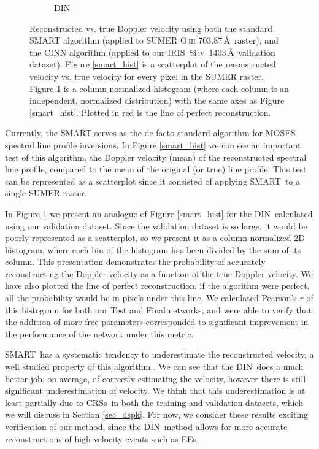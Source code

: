 \documentclass[10pt,letterpaper]{article}
\newcommand{\SiIV}{Si\,\textsc{iv}~1403\,\AA}
\newcommand{\OIII}{O\,\textsc{iii} 703.87\,\AA}
\newcommand{\EEs}{\acp{EE}}
\newcommand{\SMART}{\ac{SMART}}
\newcommand{\DIN}{\ac{DIN}}
\newcommand{\IRIS}{\ac{IRIS}}
\newcommand{\CRSs}{\acp{CRS}}
\begin{document}
\begin{figure}[t!]
\begin{subfigure}[t]{0.45\textwidth}
					\caption{DIN}
					\label{din_hist}
				\end{subfigure}
				\caption{Reconstructed vs. true Doppler velocity using both the standard SMART algorithm (applied to SUMER \OIII\ raster)\citep{Kankelborg2004}, and the CINN algorithm (applied to our \IRIS\ \SiIV\ validation dataset). 
					Figure \ref{smart_hist} is a scatterplot of the reconstructed velocity vs. true velocity for every pixel in the SUMER raster. 
					Figure \ref{din_hist} is a column-normalized histogram (where each column is an independent, normalized distribution) with the same axes as Figure \ref{smart_hist}. 
					Plotted in red is the line of perfect reconstruction.
					}
				\label{dopp_hist}
			\end{figure}

			Currently, the \SMART\citep{fox1} serves as the de facto standard algorithm for MOSES spectral line profile inversions.
			In Figure \ref{smart_hist} we can see an important test of this algorithm, the Doppler velocity (mean) of the reconstructed spectral line profile, compared to the mean of the original (or true) line profile.
			This test can be represented as a scatterplot since it consisted of applying \SMART\ to a single SUMER raster.
			
			In Figure \ref{din_hist} we present an analogue of Figure \ref{smart_hist} for the \DIN\ calculated using our validation dataset.
			Since the validation dataset is so large, it would be poorly represented as a scatterplot, so we present it as a column-normalized 2D histogram, where each bin of the histogram has been divided by the sum of its column.
			This presentation demonstrates the probability of accurately reconstructing the Doppler velocity as a function of the true Doppler velocity.
			We have also plotted the line of perfect reconstruction, if the algorithm were perfect, all the probability would be in pixels under this line.
			We calculated Pearson's $r$ of this histogram for both our Test and Final networks, and were able to verify that the addition of more free parameters corresponded to significant improvement in the performance of the network under this metric.
			
			\SMART\ has a systematic tendency to underestimate the reconstructed velocity, a well studied property of this algorithm \citep{Fox2011,Rust2017}.
			We can see that the \DIN\ does a much better job, on average, of correctly estimating the velocity, however there is still significant underestimation of velocity.
			We think that this underestimation is at least partially due to \CRSs\ in both the training and validation datasets, which we will discuss in Section \ref{sec_dspk}.
			For now, we consider these results exciting verification of our method, since the \DIN\ method allows for more accurate reconstructions of high-velocity events such as \EEs.		
						
\end{document}
